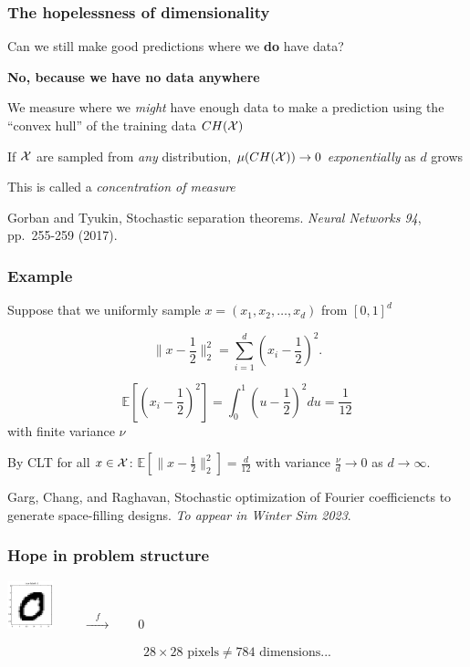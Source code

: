 \documentclass[aspectratio=169]{beamer}
\begin{document}
\begin{frame}
\frametitle{The hopelessness of dimensionality}

Can we still make good predictions where we {\bf do} have data?

\bigskip
\pause

{\bf No, because we have no data anywhere}

\bigskip

We measure where we {\sl might} have enough data to make a prediction
using the ``convex hull'' of the training data $CH({\cal X})$

\bigskip
\pause

If ${\cal X}$ are sampled from {\sl any} distribution,
$\mu(CH({\cal X})) \rightarrow 0$ {\sl exponentially} as $d$ grows

\bigskip

This is called a {\sl concentration of measure}

\vfill

{\tiny Gorban and Tyukin,
Stochastic separation theorems.
{\sl Neural Networks 94}, pp.~255-259 (2017).}

\end{frame}

\begin{frame}
\frametitle{Example}

Suppose that we uniformly sample $x = (x_1, x_2, \ldots, x_d)$ from $[0, 1]^d$

\bigskip

$$
\|x - \frac{1}{2}\|_2^2 = \sum_{i=1}^d{(x_i - \frac{1}{2})^2}.
$$

$$
\mathbb{E}\left[ \left(x_i - \frac{1}{2}\right)^2 \right]
= \int_{0}^1 \left(u - \frac{1}{2}\right)^2 du
= \frac{1}{12}
$$
with finite variance $\nu$

\bigskip

By CLT for all $x \in {\cal X}$:
$\mathbb{E}[\|x - \frac{1}{2}\|_2^2] = \frac{d}{12}$
with variance $\frac{\nu}{d}\rightarrow 0$ as $d\rightarrow\infty$.

\vfill

{\tiny Garg, Chang, and Raghavan,
Stochastic optimization of Fourier coefficiencts to generate space-filling designs.
{\sl To appear in Winter Sim 2023}.}

\end{frame}

\begin{frame}
\frametitle{Hope in problem structure}
\begin{center}
\includegraphics[width=0.1\textwidth]{../img/delaunay_new/mnist_data_0.png}
{\huge $\qquad \xrightarrow{\quad f \quad} \qquad 0$}
\end{center}

\bigskip
$$
28 \times 28 \text{ pixels} \neq 784 \text{ dimensions...}
$$

\end{frame}
\end{document}
